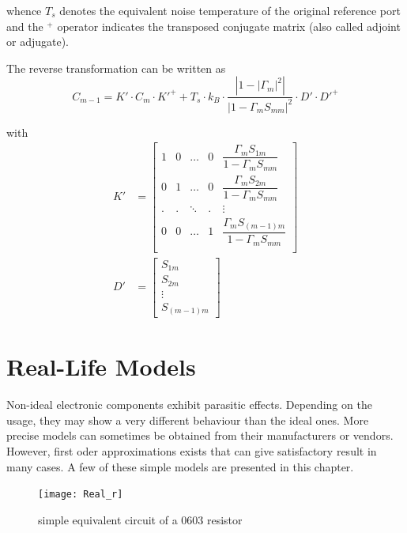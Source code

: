 whence $T_s$ denotes the equivalent noise temperature of the original
reference port and the $ ^{+}$ operator indicates the transposed
conjugate matrix (also called adjoint or adjugate).

\addvspace{12pt}

The reverse transformation can be written as
\begin{equation}
C_{m-1} = K'\cdot C_m\cdot K'^+ +T_s\cdot k_B \cdot\dfrac{\left|1 - \left|\Gamma_m\right|^2\right|}{\left|1 - \Gamma_m S_{mm}\right|^2}\cdot D'\cdot D'^+
\end{equation}

with
\begin{align}
K' &=
\begin{bmatrix}
1 & 0 & \ldots & 0 & \dfrac{\Gamma_m S_{1m}}{1 - \Gamma_m S_{mm}}\\
0 & 1 & \ldots & 0 & \dfrac{\Gamma_m S_{2m}}{1 - \Gamma_m S_{mm}}\\
. & . & \ddots & . & \vdots\\
0 & 0 & \ldots & 1 & \dfrac{\Gamma_m S_{(m-1)m}}{1 - \Gamma_m S_{mm}}\\
\end{bmatrix}\\
D' &=
\begin{bmatrix}
S_{1m}\\
S_{2m}\\
\vdots\\
S_{(m-1)m}
\end{bmatrix}
\end{align}


\section{Real-Life Models}

Non-ideal electronic components exhibit parasitic effects.
Depending on the usage, they may show a very different behaviour than
the ideal ones. More precise models can sometimes be obtained from their
manufacturers or vendors. However, first oder approximations exists
that can give satisfactory result in many cases. A few of these simple
models are presented in this chapter.

\addvspace{12pt}

\begin{figure}[ht]
\begin{center}
\texttt{[image: Real\_r]}
\end{center}
\caption{simple equivalent circuit of a 0603 resistor}
\label{fig:real_r}
\end{figure}
\FloatBarrier

